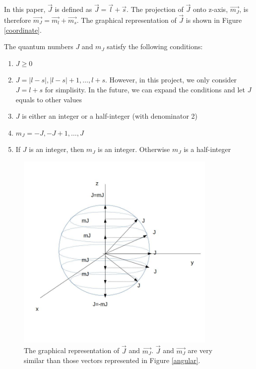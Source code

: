 \documentclass[12pt,journal,compsoc]{IEEEtran}
\begin{document}
In this paper, $\vec{J}$ is defined as $\vec{J} = \vec{l} +\vec{s}$. The projection of $\vec{J}$ onto z-axis, $\vec{m_J}$, is therefore $\vec{m_J} = \vec{m_l}+ \vec{m_s}$. The graphical representation of $\vec{J}$ is shown in Figure \ref{coordinate}.

The quantum numbers $J$ and $m_J$ satisfy the following conditions:


\begin{enumerate}

\item $J \ge 0$

\item $J=|l-s|,|l-s|+1,\ldots, l+s$. However, in this project, we only consider $J=l+s$ for simplisity. In the future, we can expand the conditions and let $J$ equals to other values

\item $J$ is either an integer or a half-integer (with denominator 2)

\item $m_J= -J, -J+1, \ldots, J$

\item If $J$ is an integer, then $m_J$ is an integer. Otherwise $m_J$ is a half-integer

\end{enumerate}

\begin{figure}

\centering
\includegraphics[width=3.8in]{jstate}
\caption{The graphical representation of $\vec{J}$ and $\vec{m_J}$. $\vec{J}$ and $\vec{m_J}$ are very similar than those vectors represented in Figure \ref{angular}.}
\label{jstate}

\end{figure}
\end{document}
